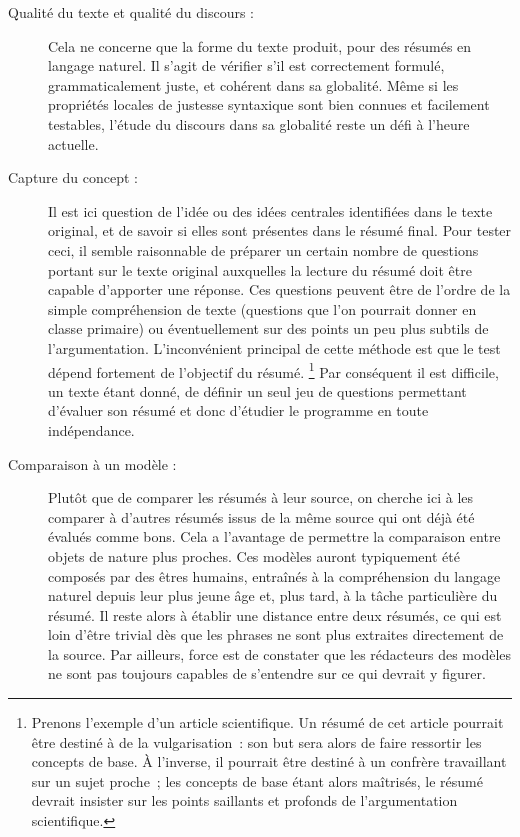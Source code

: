 \documentclass[a4paper, 12pt]{article}
\begin{document}
\begin{description}
  \item [Qualité du texte et qualité du discours :] Cela ne concerne que la forme du texte produit, pour des résumés en langage naturel. Il s'agit de vérifier s'il est correctement formulé, grammaticalement juste, et cohérent dans sa globalité. Même si les propriétés locales de justesse syntaxique sont bien connues et facilement testables, l'étude du discours dans sa globalité reste un défi à l'heure actuelle.
  \item [Capture du concept :] Il est ici question de l'idée ou des idées centrales identifiées dans le texte original, et de savoir si elles sont présentes dans le résumé final. Pour tester ceci, il semble raisonnable de préparer un certain nombre de questions portant sur le texte original auxquelles la lecture du résumé doit être capable d'apporter une réponse. Ces questions peuvent être de l'ordre de la simple compréhension de texte (questions que l'on pourrait donner en classe primaire) ou éventuellement sur des points un peu plus subtils de l'argumentation. L'inconvénient principal de cette méthode est que le test dépend fortement de l'objectif du résumé. \footnote{Prenons l'exemple d'un article scientifique. Un résumé de cet article pourrait être destiné à de la vulgarisation~: son but sera alors de faire ressortir les concepts de base. À l'inverse, il pourrait être destiné à un confrère travaillant sur un sujet proche~; les concepts de base étant alors maîtrisés, le résumé devrait insister sur les points saillants et profonds de l'argumentation scientifique.} Par conséquent il est difficile, un texte étant donné, de définir un seul jeu de questions permettant d'évaluer son résumé et donc d'étudier le programme en toute indépendance.
  \item [Comparaison à un modèle :] Plutôt que de comparer les résumés à leur source, on cherche ici à les comparer à d'autres résumés issus de la même source qui ont déjà été évalués comme bons. Cela a l'avantage de permettre la comparaison entre objets de nature plus proches. Ces modèles auront typiquement été composés par des êtres humains, entraînés à la compréhension du langage naturel depuis leur plus jeune âge et, plus tard, à la tâche particulière du résumé. Il reste alors à établir une distance entre deux résumés, ce qui est loin d'être trivial dès que les phrases ne sont plus extraites directement de la source. Par ailleurs, force est de constater que les rédacteurs des modèles ne sont pas toujours capables de s'entendre sur ce qui devrait y figurer.
 \end{description}
\end{document}
